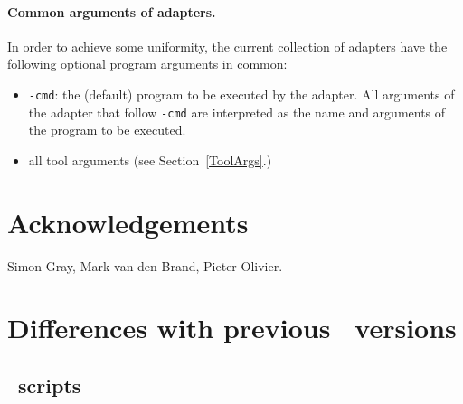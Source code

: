 \documentclass[a4,twoside,noweb]{article} %
\begin{document}
\paragraph{Common arguments of adapters.} In order to achieve some uniformity,
the current collection of adapters have the following optional program arguments
in common:

\begin{itemize}

\item {\tt -cmd}: the (default) program to be executed by the adapter.
All arguments of the adapter that follow {\tt -cmd} are interpreted as
the name and arguments of the program to be executed.

\item all tool arguments (see Section~\ref{ToolArgs}.)
\end{itemize}



\section*{Acknowledgements}
Simon Gray, Mark van den Brand, Pieter Olivier.
\appendix


\newpage
\section{Differences with previous \TB\ versions}

\subsection{\T\ scripts}
\end{document}
